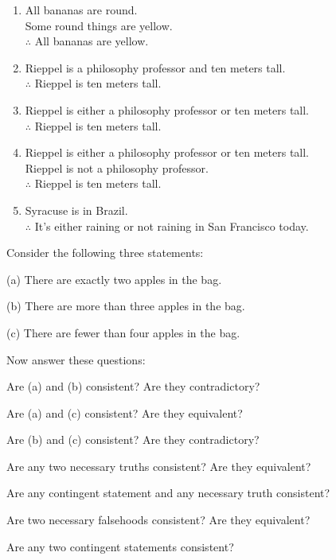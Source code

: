 \begin{enumerate}
\item All bananas are round. \\ Some round things are yellow. \\ $\therefore$ All bananas are yellow.

\item Rieppel is a philosophy professor and ten meters tall. \\ $\therefore$ Rieppel is ten meters tall.

\item Rieppel is either a philosophy professor or ten meters tall. \\ $\therefore$ Rieppel is ten meters tall.

\item Rieppel is either a philosophy professor or ten meters tall.  \\ Rieppel is not a philosophy professor. \\ $\therefore$ Rieppel is ten meters tall.

\item Syracuse is in Brazil. \\ $\therefore$ It's either raining or not raining in San Francisco today. 
\end{enumerate}

\problempart Consider the following three statements:

\begin{earg}
\item[(a)] There are exactly two apples in the bag.
\item[(b)] There are more than three apples in the bag.
\item[(c)] There are fewer than four apples in the bag.
\end{earg}

Now answer these questions:

\begin{earg}
\item Are (a) and (b) consistent?  Are they contradictory? 
\item Are (a) and (c) consistent?  Are they equivalent?
\item Are (b) and (c) consistent?  Are they contradictory? 
\item Are any two necessary truths consistent? Are they equivalent?
\item Are any contingent statement and any necessary truth consistent?  
\item Are two necessary falsehoods consistent?  Are they equivalent?
\item Are any two contingent statements consistent?
\end{earg}

